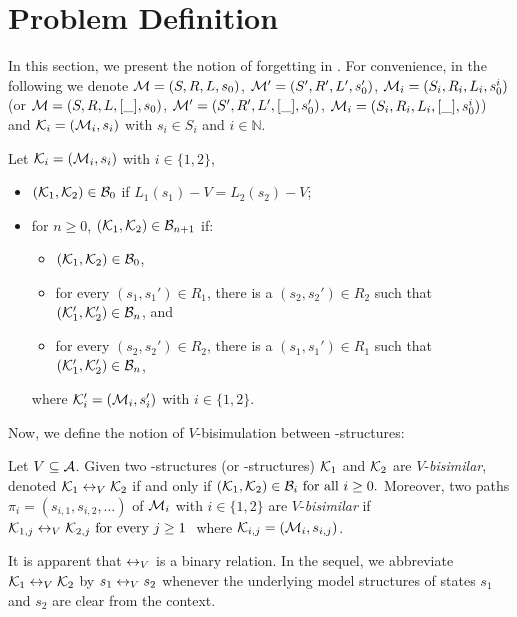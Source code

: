 \documentclass{article}
\begin{document}
\section{Problem Definition}
In this section, we present the notion of forgetting in \CTL.
For convenience, in the following we denote ${\cal M}=(S, R, L, s_0)$,
${\cal M}'=(S',R',L',s_0')$, ${\cal M}_i=(S_i, R_i,L_i, s_0^i)$ (or ${\cal M}=(S, R, L, [\_], s_0)$,
${\cal M}'=(S',R',L', [\_],s_0')$, ${\cal M}_i=(S_i, R_i,L_i, [\_], s_0^i)$) and ${\cal K}_i=({\cal M}_i, s_i)$ with $s_i \in S_i$
and $i \in \mathbb{N}$.

Let
${\cal K}_i=({\cal M}_i,s_i)$ with $i\in\{1,2\}$,
\begin{itemize}
  \item $({\cal K}_1,{\cal K}_2)\in{\cal B}_0$ if $L_1(s_1)- V=L_2(s_2)- V$;  %
  \item for $n\ge 0$, $({\cal K}_1,{\cal K}_2)\in{\cal B}_{n+1}$ if:
  \begin{itemize}
    \item $({\cal K}_1,{\cal K}_2)\in{\cal B}_0$,
    \item for every $(s_1,s_1')\in R_1$, there is a $(s_2,s_2')\in R_2$
    such that $({\cal K}_1',{\cal K}_2')\in {\cal B}_n$, and
    \item for every $(s_2,s_2')\in R_2$, there is a $(s_1,s_1')\in R_1$
    such that $({\cal K}_1',{\cal K}_2')\in {\cal B}_n$,
  \end{itemize}
  where ${\cal K}_i'=({\cal M}_i,s_i')$ with $i\in\{1,2\}$.
\end{itemize}

Now, we define the notion of $V$-bisimulation between \MPK-structures:
\begin{definition}[$V$-bisimulation]
  \label{def:V-bisimulation}
   Let $V\subseteq\cal A$. Given   two \MPK-structures (or \Ind-structures) ${\cal K}_1$ and ${\cal K}_2$ are $V$-{\em bisimilar},  denoted ${\cal K}_1 \leftrightarrow_V {\cal K}_2$
 if and only if $ ({\cal K}_1,{\cal K}_2)\in {{\cal B}_i}\mbox{ for all }i\ge 0.$ Moreover, two paths $\pi_i=(s_{i,1},s_{i,2},\ldots)$ of ${\cal M}_i$ with $i\in \{1,2\}$
 are $V$-{\em bisimilar} if
$ {\cal K}_{1,j} \leftrightarrow_V {\cal K}_{2,j}\mbox { for every $j\ge 1$ }$
 where ${\cal K}_{i,j}=({\cal M}_i,s_{i,j})$.
\end{definition}

It is  apparent that $\leftrightarrow_V$ is a binary relation.
 In the sequel, we abbreviate ${\cal K}_1 \leftrightarrow_V {\cal K}_2$
 by $s_1 \leftrightarrow_V s_2 $
 whenever the underlying model structures of states $s_1$ and $s_2$ are clear from the context.
\end{document}
